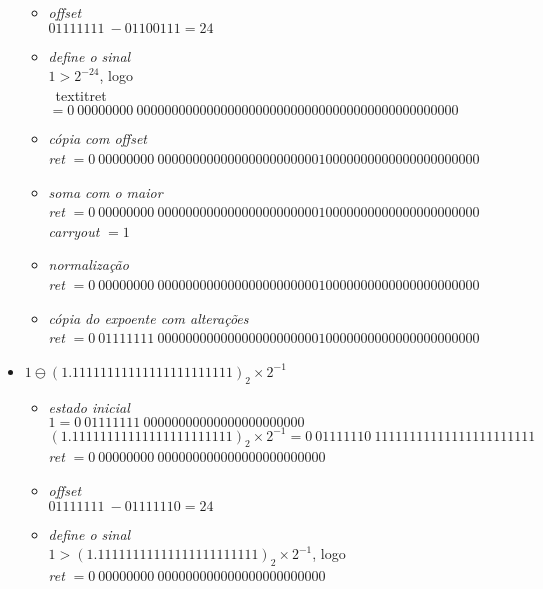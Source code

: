 \documentclass{article}
\begin{document}
\begin{itemize}
\begin{itemize}
    \item \textit{offset} \\
    ${01111111}\ - {01100111} = 24$
    
    \item \textit{define o sinal} \\
    $1 > 2^{-24}$, logo \\\
    textit{ret} $= {0}\ {00000000}\ {0000000000000000000000000000000000000000000000}$ 
     
    \item \textit{cópia com offset} \\
    \textit{ret} $= {0}\ {00000000}\ {0000000000000000000000010000000000000000000000}$
      
    \item \textit{soma com o maior} \\
    \textit{ret} $= {0}\ {00000000}\ {0000000000000000000000010000000000000000000000}$
    \textit{carryout} $= 1$

    \item \textit{normalização} \\
    \textit{ret} $= {0}\ {00000000}\ {0000000000000000000000010000000000000000000000}$
    
    \item \textit{cópia do expoente com alterações} \\
    \textit{ret} $= {0}\ {01111111}\ {0000000000000000000000010000000000000000000000}$
    \end{itemize}

\item $1 \ominus {(1.11111111111111111111111)}_{2} \times 2^{-1}$
    \begin{itemize}
        
    \item \textit{estado inicial} \\    
    $1 = {0}\ {01111111}\ {00000000000000000000000}$ \\
    ${(1.11111111111111111111111)}_{2} \times 2^{-1} = {0}\ {01111110}\ {11111111111111111111111}$ \\
    \textit{ret} $= {0}\ {00000000}\ {000000000000000000000000}$

    \item \textit{offset} \\
    ${01111111}\ - {01111110} = 24$
    
    \item \textit{define o sinal} \\
    $1 > {(1.11111111111111111111111)}_{2} \times 2^{-1}$, logo \\ 
    \textit{ret} $= {0}\ {00000000}\ {000000000000000000000000}$ \\
      

\end{itemize}
\end{itemize}
\end{document}
